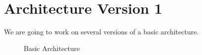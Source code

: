 \section{Architecture Version 1}
We are going to work on several versions of a basic architecture.
\begin{figure}[h!]
  \centering
  \caption{Basic Architecture}
\end{figure}
